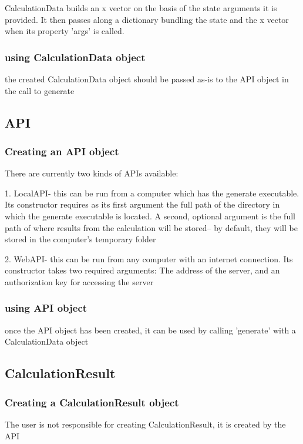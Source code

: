 \documentclass[12pt]{article}
\begin{document}
CalculationData builds an x vector on the basis of the state arguments it is provided.
It then passes along a dictionary bundling the state and the x vector when its property 'args' is called.

\subsubsection{using CalculationData object}

the created CalculationData object should be passed as-is to the API object in the call to generate
	
	\subsection{API}
\subsubsection{Creating an API object}

There are currently two kinds of APIs available:

1. LocalAPI- this can be run from a computer which has the generate executable. Its constructor requires as
its first argument the full path of the directory in which the generate executable is located. A second, optional
argument is the full path of where results from the calculation will be stored-- by default, they will be stored
in the computer's temporary folder

2. WebAPI- this can be run from any computer with an internet connection.
Its constructor takes two required arguments: The address of the server, and an authorization key
for accessing the server

\subsubsection{using API object}
once the API object has been created, it can be used by calling 'generate' with a CalculationData object
	
	\subsection{CalculationResult}
\subsubsection{Creating a CalculationResult object}
The user is not responsible for creating CalculationResult, it is created by the API
\end{document}
